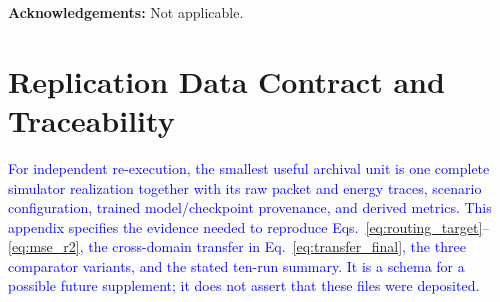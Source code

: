 \documentclass[pdflatex,sn-mathphys-num]{sn-jnl}
\newcommand{\Revised}[1]{\textcolor{blue}{#1}}
\begin{document}
\medskip
\noindent

\textbf{Acknowledgements:}
Not applicable.


\appendix
\section{Replication Data Contract and Traceability}
\label{app:replication_final}
\Revised{For independent re-execution, the smallest useful archival unit is one complete simulator realization together with its raw packet and energy traces, scenario configuration, trained model/checkpoint provenance, and derived metrics. This appendix specifies the evidence needed to reproduce Eqs.~\eqref{eq:routing_target}--\eqref{eq:mse_r2}, the cross-domain transfer in Eq.~\eqref{eq:transfer_final}, the three comparator variants, and the stated ten-run summary. It is a schema for a possible future supplement; it does not assert that these files were deposited.}
\end{document}
